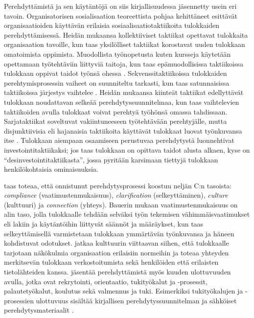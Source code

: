 \documentclass[utf8]{gradu3}
\begin{document}
Perehdyttämistä ja sen käytäntöjä on siis kirjallisuudessa jäsennetty usein eri tavoin. Organisatorisen sosialisaation teoreettista pohjaa kehittäneet \textcite{van-maanen-schein-1979} esittävät organisaatioiden käyttävän erilaisia sosiaalisaatiotaktiikoita tulokkaiden perehdyttämisessä. Heidän mukaansa kollektiiviset taktiikat opettavat tulokkaita organisaation tavoille, kun taas yksilölliset taktiikat korostavat uuden tulokkaan omatoimista oppimista. Muodollista työnopetusta kuten kursseja käytetään opettamaan työtehtäviin liittyviä taitoja, kun taas epämuodollisissa taktiikoissa tulokkaan oppivat taidot työnsä ohessa \parencite{van-maanen-schein-1979}. Sekvenssitaktiikoissa tulokkaiden perehtymisprosessin vaiheet on suunniteltu tarkasti, kun taas satunnaisissa taktiikoissa järjestys vaihtelee \parencite{van-maanen-schein-1979}. Heidän mukaansa kiinteät taktiikat edellyttävät tulokkaan noudattavan selkeää perehdytyssuunnitelmaa, kun taas vaihtelevien taktiikoiden avulla tulokkaat voivat perehtyä työhönsä omassa tahdissaan. Sarjataktiikat soveltuvat vakiintuneeseen työtehtävään perehtyjälle, mutta disjunktiivisia eli hajanaisia taktiikoita käyttävät tulokkaat luovat työnkuvansa itse \parencite{van-maanen-schein-1979}. Tulokkaan aiempaan osaamiseen perustuvaa perehdytystä \textcite{van-maanen-schein-1979} luonnehtivat investointitaktiikaksi; jos taas tulokkaan on opittava taidot alusta alkaen, kyse on ``desinvestointitaktiikasta'', jossa pyritään karsimaan tiettyjä tulokkaan henkilökohtaisia ominaisuuksia.

\textcite{bauer-2010} taas toteaa, että onnistunut perehdytysprosessi koostuu neljän C:n tasoista: \textit{compliance} (vaatimustenmukaisuus), \textit{clarification} (selkeyttäminen), \textit{culture} (kulttuuri) ja \textit{connection} (yhteys). Bauerin mukaan vaatimustenmukaisuus on alin taso, jolla tulokkaalle tehdään selväksi työn tekemisen vähimmäisvaatimukset eli lakiin ja käytäntöihin liittyvät säännöt ja määräykset, kun taas selkeyttämisellä varmistetaan tulokkaan ymmärtävän työnkuvansa ja häneen kohdistuvat odotukset. \textcite{bauer-2010} jatkaa kulttuurin viittaavan siihen, että tulokkaalle tarjotaan näkökulmia organisaation erilaisiin normeihin ja toteaa yhteyden merkitsevän tulokkaan verkostoitumista sekä henkilöiden että erilaisten tietolähteiden kanssa. \textcite{bauer-2010} jäsentää perehdyttämistä myös kuuden ulottuvuuden avulla, jotka ovat rekrytointi, orientaatio, tukityökalut ja -prosessit, palautetyökalut, koulutus sekä valmennus ja tuki. Esimerkiksi tukityökalujen ja -prosessien ulottuvuus sisältää kirjallisen perehdytyssuunnitelman ja sähköiset perehdytysmateriaalit \parencite{bauer-2010}.
\end{document}
